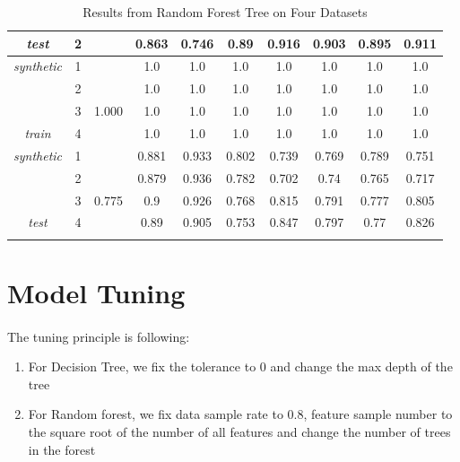 \documentclass[11pt]{article}
\begin{document}
\begin{center}
\begin{longtable}{| c | c | c | c | c | c | c | c | c | c |}
    		 \textit{test}    & 2 & & 0.863 & 0.746 & 0.89& 0.916& 0.903& 0.895& 0.911\\
    		 \hline
    		 \textit{synthetic} & 1 & & 1.0 & 1.0 & 1.0& 1.0& 1.0& 1.0& 1.0\\
    		                    & 2 & & 1.0 & 1.0 & 1.0& 1.0& 1.0& 1.0& 1.0\\
    		                    & 3 & 1.000 & 1.0 & 1.0 & 1.0& 1.0& 1.0& 1.0& 1.0\\
    		 \textit{train}	    & 4 & & 1.0 & 1.0 & 1.0& 1.0& 1.0& 1.0& 1.0\\
    		 \hline
    		 \textit{synthetic} & 1 & & 0.881 & 0.933 & 0.802& 0.739& 0.769& 0.789& 0.751\\
    		                    & 2 & & 0.879 & 0.936 & 0.782& 0.702& 0.74& 0.765& 0.717\\
    		                    & 3 & 0.775&0.9 & 0.926 & 0.768& 0.815& 0.791& 0.777& 0.805\\
    		 \textit{test}	    & 4 & &0.89 & 0.905 & 0.753& 0.847& 0.797& 0.77& 0.826\\
    		 \hline
    	\caption{Results from Random Forest Tree on Four Datasets}
    \end{longtable}
    \end{center}
    
    \section{Model Tuning}
    
    \paragraph{}
    
    The tuning principle is following:
    \begin{enumerate}
    	\item For Decision Tree, we fix the tolerance to $0$ and change the max depth of the tree
    	\item For Random forest, we fix data sample rate to $0.8$, feature sample number to the square root of the number of all features and change the number of trees in the forest
    \end{enumerate}
    
\end{document}
